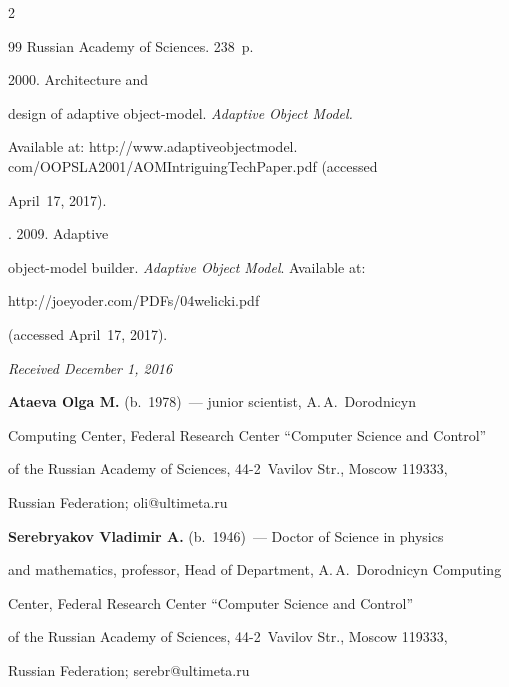 \begin{multicols}{2}
{{\begin{thebibliography}{99}
Russian Academy of Sciences. 238~p.


 2000. Architecture and 

design of adaptive object-model. \textit{Adaptive Object Model.} 

Available at: {\sf http://www.adaptiveobjectmodel. com/OOPSLA2001/AOMIntriguingTechPaper.pdf} (accessed 

April~17, 2017).


. 2009. Adaptive  

object-model builder. \textit{Adaptive Object Model}. Available at: {\sf 

http://joeyoder.com/PDFs/04welicki.pdf} (accessed April~17, 2017). 

\end{thebibliography}



 }

 }



\end{multicols}



\vspace*{-3pt}



\hfill{\small\textit{Received December 1, 2016}}



\Contr



\noindent

\textbf{Ataeva Olga M.} (b.\ 1978)~--- junior scientist, A.\,A.~Dorodnicyn 

Computing Center, Federal Research Center ``Computer Science and Control'' 

of the Russian Academy of Sciences, 44-2~Vavilov Str., Moscow 119333, 

Russian Federation; \mbox{oli@ultimeta.ru}



\vspace*{3pt}



\noindent

\textbf{Serebryakov Vladimir A.} (b.\ 1946)~--- Doctor of Science in physics 

and mathematics, professor, Head of Department, A.\,A.~Dorodnicyn Computing 

Center, Federal Research Center ``Computer Science and Control'' 

of the Russian Academy of Sciences, 44-2~Vavilov Str., Moscow 119333, 

Russian Federation; \mbox{serebr@ultimeta.ru}

\label{end\stat}





\renewcommand{\bibname}{\protect\rm Литература} 

